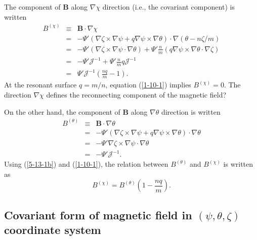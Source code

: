 \documentclass{llncs}
\begin{document}
The component of $\mathbf{B}$ along $\nabla \chi$ direction (i.e., the
covariant component) is written
\begin{eqnarray}
  B^{(\chi)} & \equiv & \mathbf{B} \cdot \nabla \chi \nonumber\\
  & = & - \Psi' (\nabla \zeta \times \nabla \psi + q \nabla \psi \times
  \nabla \theta) \cdot \nabla (\theta - n \zeta / m) \nonumber\\
  & = & - \Psi' (\nabla \zeta \times \nabla \psi \cdot \nabla \theta) + \Psi'
  \frac{n}{m} (q \nabla \psi \times \nabla \theta \cdot \nabla \zeta)
  \nonumber\\
  & = & - \Psi' \mathcal{J}^{- 1} + \Psi' \frac{n}{m} q\mathcal{J}^{- 1}
  \nonumber\\
  & = & \Psi' \mathcal{J}^{- 1} \left( \frac{n q}{m} - 1 \right) . 
  \label{1-10-1}
\end{eqnarray}
At the resonant surface $q = m / n$, equation (\ref{1-10-1}) implies
$B^{(\chi)} = 0$. The direction $\nabla \chi$ defines the reconnecting
component of the magnetic field?

On the other hand, the component of $\mathbf{B}$ along $\nabla \theta$
direction is written
\begin{eqnarray}
  B^{(\theta)} & \equiv & \mathbf{B} \cdot \nabla \theta \nonumber\\
  & = & - \Psi' (\nabla \zeta \times \nabla \psi + q \nabla \psi \times
  \nabla \theta) \cdot \nabla \theta \nonumber\\
  & = & - \Psi' \nabla \zeta \times \nabla \psi \cdot \nabla \theta
  \nonumber\\
  & = & - \Psi' \mathcal{J}^{- 1} .  \label{5-13-1b}
\end{eqnarray}
Using (\ref{5-13-1b}) and (\ref{1-10-1}), the relation between $B^{(\theta)}$
and $B^{(\chi)}$ is written as
\begin{equation}
  B^{(\chi)} = B^{(\theta)} \left( 1 - \frac{n q}{m} \right) .
\end{equation}
\subsection{Covariant form of magnetic field in $(\psi, \theta, \zeta)$
coordinate system}\label{23-12-26-1}
\end{document}
